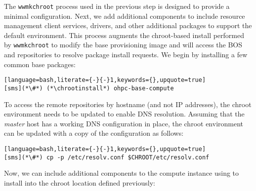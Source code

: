 The \texttt{wwmkchroot} process used in the previous step is designed to
provide a minimal \baseOS{} configuration. Next, we add additional components
to include resource management client services, \InfiniBand{} drivers, and
other additional packages to support the default \OHPC{} environment. This
process augments the chroot-based install performed by \texttt{wwmkchroot} to
modify the base provisioning image and will access the BOS and \OHPC{}
repositories to resolve package install requests. We begin by installing a few
common base packages:

\begin{lstlisting}[language=bash,literate={-}{-}1,keywords={},upquote=true]
[sms](*\#*) (*\chrootinstall*) ohpc-base-compute
\end{lstlisting}

To access the remote
repositories by hostname (and not IP addresses), the chroot environment needs
to be updated to enable DNS resolution. Assuming that the {\em master} host has
a working DNS configuration in place, the chroot environment can be updated
with a copy of the configuration as follows:

\begin{lstlisting}[language=bash,literate={-}{-}1,keywords={},upquote=true]
[sms](*\#*) cp -p /etc/resolv.conf $CHROOT/etc/resolv.conf
\end{lstlisting}

\noindent Now, we can include additional components to the compute instance using
\texttt{\pkgmgr{}} to install into the chroot location defined previously:
